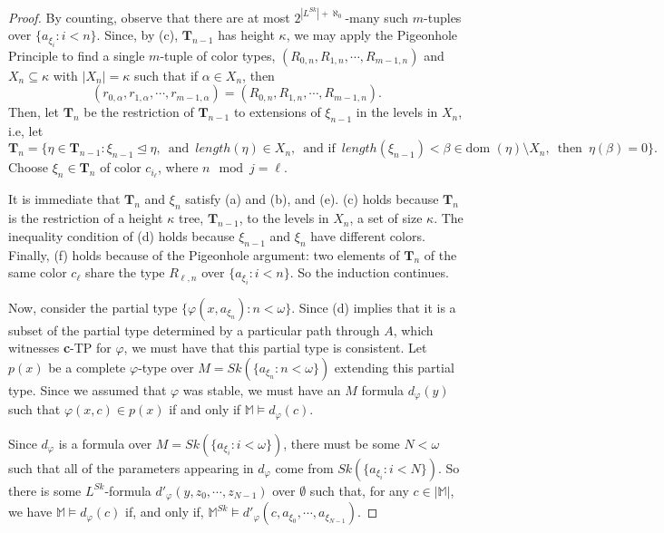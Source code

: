 \documentclass[10pt,a4paper]{amsart}
\newcommand{\bbM}{\mathbb{M}}
\newcommand{\dom}{\text{dom }}
\newcommand{\vphi}{\varphi}
\begin{document}
\begin{proof}
    By counting, observe that there are at most $2^{|L^{Sk}|+\aleph_0}$-many such $m$-tuples over $\{a_{\xi_i}\colon i<n\}$. Since, by (c), $\textbf{T}_{n-1}$ has height $\kappa$, we may apply the Pigeonhole Principle to find a single $m$-tuple of color types, $(R_{0,n},R_{1,n},\dotsm, R_{m-1,n})$
     and $X_n\subseteq \kappa$ with $|X_n|=\kappa$ such that if $\alpha\in X_n$, then $$(r_{0,\alpha},r_{1,\alpha},\dotsm, r_{m-1,\alpha})=(R_{0,n},R_{1,n},\dotsm, R_{m-1,n}).$$
     Then, let $\textbf{T}_n$ be the restriction of $\textbf{T}_{n-1}$ to extensions of $\xi_{n-1}$ in the levels in $X_n$, i.e, let
     $$\textbf{T}_n=\{\eta\in \textbf{T}_{n-1}\colon \xi_{n-1}\trianglelefteq\eta,\enspace\text{and}\enspace length(\eta)\in X_n,\enspace\text{and if}\enspace length(\xi_{n-1})<\beta \in\dom(\eta)\setminus X_n,\enspace\text{then}\enspace \eta(\beta)=0\}.$$
     Choose $\xi_n\in\textbf{T}_n$ of color $c_{i_\ell}$, where $n\mod j=\ell$.

    It is immediate that $\textbf{T}_n$ and $\xi_n$ satisfy (a) and (b), and (e). (c) holds because $\textbf{T}_n$ is the restriction of a height $\kappa$ tree, $\textbf{T}_{n-1}$, to the levels in $X_n$, a set of size $\kappa$. The inequality condition of (d) holds because $\xi_{n-1}$ and $\xi_n$ have different colors. Finally, (f) holds because of the Pigeonhole argument: two elements of $\textbf{T}_n$ of the same color $c_\ell$ share the type $R_{\ell,n}$ over $\{a_{\xi_i}\colon i<n\}$. So the induction continues.

     Now, consider the partial type $\{\vphi(x, a_{\xi_n})\colon n< \omega\}$. Since (d) implies that it is a subset of the partial type determined by a particular path through $A$, which witnesses \textbf{c}-TP for $\vphi$, we must have that this partial type is consistent. Let $p(x)$ be a complete $\vphi$-type over  $M=Sk(\{a_{\xi_n}\colon n<\omega\})$ extending this partial type. %
    Since we assumed that $\vphi$ was stable, we must have an $M$ formula $d_\vphi(y)$ such that $\vphi(x,c)\in p(x)$ if and only if $\bbM\models d_\vphi(c)$. 

    Since $d_\vphi$ is a formula over $M=Sk(\{a_{\xi_i}\colon i<\omega\})$, there must be some $N<\omega$ such that all of the parameters appearing in $d_\vphi$ come from $Sk(\{a_{\xi_i}\colon i<N\})$.  So there is some $L^{Sk}$-formula $d'_\vphi(y,z_0,\dotsm, z_{N-1})$ over $\emptyset$ such that, for any $c\in|\bbM|$, we have $\bbM\models d_\vphi(c)$ if, and only if, $\bbM^{Sk}\models d'_\vphi(c,a_{\xi_0},\dotsm, a_{\xi_{N-1}})$.
    

\end{proof}
\end{document}

